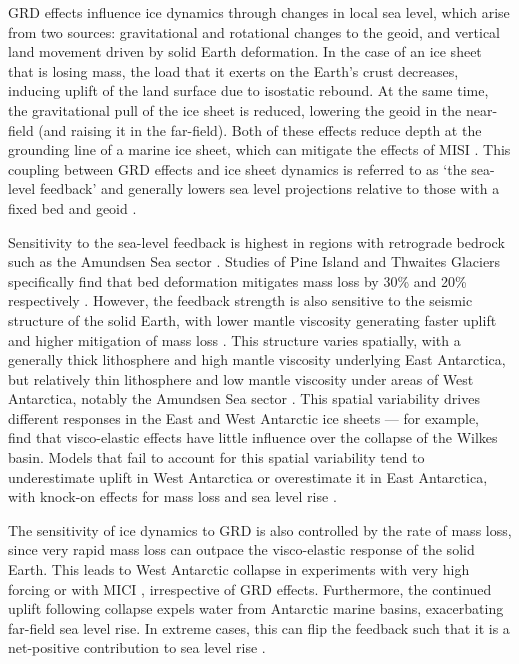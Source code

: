 GRD effects influence ice dynamics through changes in local sea level, which arise from two sources: gravitational and rotational changes to the geoid, and vertical land movement driven by solid Earth deformation. In the case of an ice sheet that is losing mass, the load that it exerts on the Earth's crust decreases, inducing uplift of the land surface due to isostatic rebound. At the same time, the gravitational pull of the ice sheet is reduced, lowering the geoid in the near-field (and raising it in the far-field). Both of these effects reduce depth at the grounding line of a marine ice sheet, which can mitigate the effects of MISI \citep{gomezSeaLevelStabilizing2010}. This coupling between GRD effects and ice sheet dynamics is referred to as `the sea-level feedback' and generally lowers sea level projections relative to those with a fixed bed and geoid \citep{gomezSealevelFeedbackLowers2015,larourSlowdownAntarcticMass2019,gomezInfluenceRealistic3D2024,hanImprovingProjectionsAntarctic2025}.

Sensitivity to the sea-level feedback is highest in regions with retrograde bedrock such as the Amundsen Sea sector \citep{larourSlowdownAntarcticMass2019,hanImprovingProjectionsAntarctic2025}. Studies of Pine Island and Thwaites Glaciers specifically find that bed deformation mitigates mass loss by 30\% and 20\% respectively \citep{kachuckRapidViscoelasticDeformation2020,bookStabilizingEffectBedrock2022}. However, the feedback strength is also sensitive to the seismic structure of the solid Earth, with lower mantle viscosity generating faster uplift and higher mitigation of mass loss \citep{gomezSealevelFeedbackLowers2015,coulonContrastingResponseWest2021}. This structure varies spatially, with a generally thick lithosphere and high mantle viscosity underlying East Antarctica, but relatively thin lithosphere and low mantle viscosity under areas of West Antarctica, notably the Amundsen Sea sector \citep{lloydSeismicStructureAntarctic2020}. This spatial variability drives different responses in the East and West Antarctic ice sheets --- for example,~\cite{coulonContrastingResponseWest2021} find that visco-elastic effects have little influence over the collapse of the Wilkes basin. Models that fail to account for this spatial variability tend to underestimate uplift in West Antarctica or overestimate it in East Antarctica, with knock-on effects for mass loss and sea level rise \citep{coulonContrastingResponseWest2021,gomezInfluenceRealistic3D2024,hanImprovingProjectionsAntarctic2025}.

The sensitivity of ice dynamics to GRD is also controlled by the rate of mass loss, since very rapid mass loss can outpace the visco-elastic response of the solid Earth. This leads to West Antarctic collapse in experiments with very high forcing \citep{gomezSealevelFeedbackLowers2015,coulonContrastingResponseWest2021,gomezInfluenceRealistic3D2024} or with MICI \citep{gomezInfluenceRealistic3D2024}, irrespective of GRD effects. Furthermore, the continued uplift following collapse expels water from Antarctic marine basins, exacerbating far-field sea level rise. In extreme cases, this can flip the feedback such that it is a net-positive contribution to sea level rise \citep{gomezInfluenceRealistic3D2024}.

